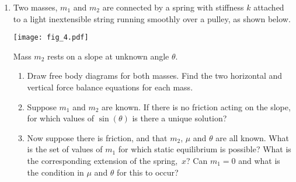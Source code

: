 {\begin{enumerate}
\item Two masses, $m_{1}$ and $m_{2}$ are connected by a spring with stiffness $k$ attached to a light inextensible string running smoothly over a pulley, as shown below.
            \begin{center}
                \texttt{[image: fig\_4.pdf]}
            \end{center}
	    Mass $m_{2}$ rests on a slope at unknown angle $\theta$. 
            \begin{enumerate}
            \item Draw free body diagrams for both masses. Find the two horizontal and vertical force balance equations for each mass. 
	    \item Suppose $m_{1}$ and $m_{2}$ are known. If there is no friction acting on the slope, for which values of $\sin(\theta)$ is there a unique solution?
	    \item Now suppose there is friction, and that $m_{2}$, $\mu$ and $\theta$ are all known. What is the set of values of $m_{1}$ for which static equilibrium is possible? What is the corresponding extension of the spring,~$x$? Can $m_{1}=0$ and what is the condition in $\mu$ and $\theta$ for this to occur?  
	    \end{enumerate}
 \end{enumerate}
}